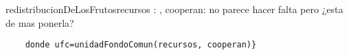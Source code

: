 \documentclass[document.tex]{subfiles}
\begin{document}
\begin{proc}{redistribucionDeLosFrutos}{\In recursos : \TLista{\float}, \In cooperan: \TLista{\bool}}{\TLista{\float}}
 no parece hacer falta pero ¿esta de mas ponerla?
\begin{verbatim}
    donde ufc=unidadFondoComun(recursos, cooperan)}
\end{verbatim}
\end{proc}
\end{document}
